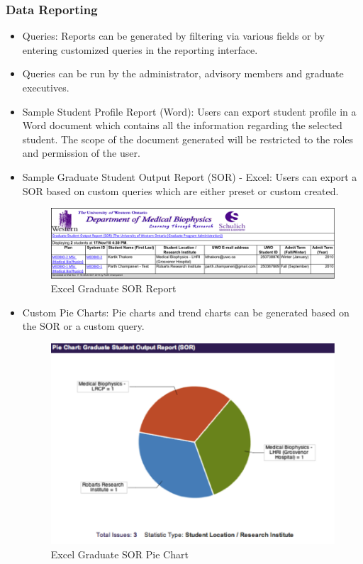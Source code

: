 \documentclass[11pt,a4paper]{report}
\begin{document}
\subsubsection{ Data Reporting }
\begin{itemize}
\item Queries: Reports can be generated by filtering via various fields or by entering customized queries in the reporting interface.
\item Queries can be run by the administrator, advisory members and graduate executives.
\item Sample Student Profile Report (Word): Users can export student profile in a Word document which contains all the information regarding the selected student. The scope of the document generated will be restricted to the roles and permission of the user.
\item Sample Graduate Student Output Report (SOR) - Excel: Users can export a SOR based on custom queries which are either preset or custom created.

\begin{figure}[htp]
\centering
\includegraphics[scale=1]{diagrams/HTMLTemplating/SOR_Excel.png}
\caption{Excel Graduate SOR Report}
\label{fig:ExcelSOR}
\end{figure}

\item Custom Pie Charts: Pie charts and trend charts can be generated based on the SOR or a custom query.

\begin{figure}[htp]
\centering
\includegraphics[scale=1]{diagrams/HTMLTemplating/PieChart.png}
\caption{Excel Graduate SOR Pie Chart}
\label{fig:PieSOR}
\end{figure}

\end{itemize}
\end{document}
